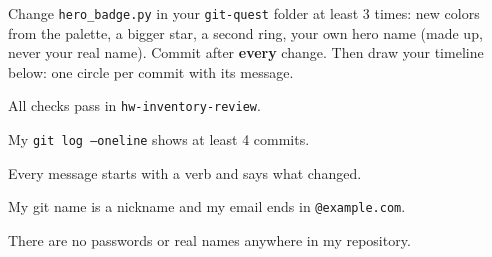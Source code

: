 \begin{creative}
Change \texttt{hero\_badge.py} in your \texttt{git-quest} folder at least 3 times: new colors from the palette, a bigger star, a second ring, your own hero name (made up, never your real name). Commit after \textbf{every} change. Then draw your timeline below: one circle per commit with its message.
\answerspace{3cm}
\end{creative}

\begin{selfcheck}
  \item All checks pass in \texttt{hw-inventory-review}.
  \item My \texttt{git log --oneline} shows at least 4 commits.
  \item Every message starts with a verb and says what changed.
  \item My git name is a nickname and my email ends in \texttt{@example.com}.
  \item There are no passwords or real names anywhere in my repository.
\end{selfcheck}
